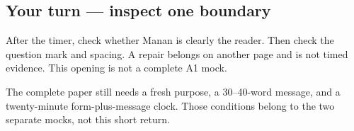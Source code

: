 \subsection*{Your turn — inspect one boundary}
After the timer, check whether Manan is clearly the reader. Then check the question mark and spacing. A repair belongs on another page and is not timed evidence. This opening is not a complete A1 mock.

\begin{tcolorbox}[breakable,colback=teal!4,colframe=teal!35!black,title={Before you move on}]
The complete paper still needs a fresh purpose, a 30–40-word message, and a twenty-minute form-plus-message clock. Those conditions belong to the two separate mocks, not this short return.
\end{tcolorbox}
